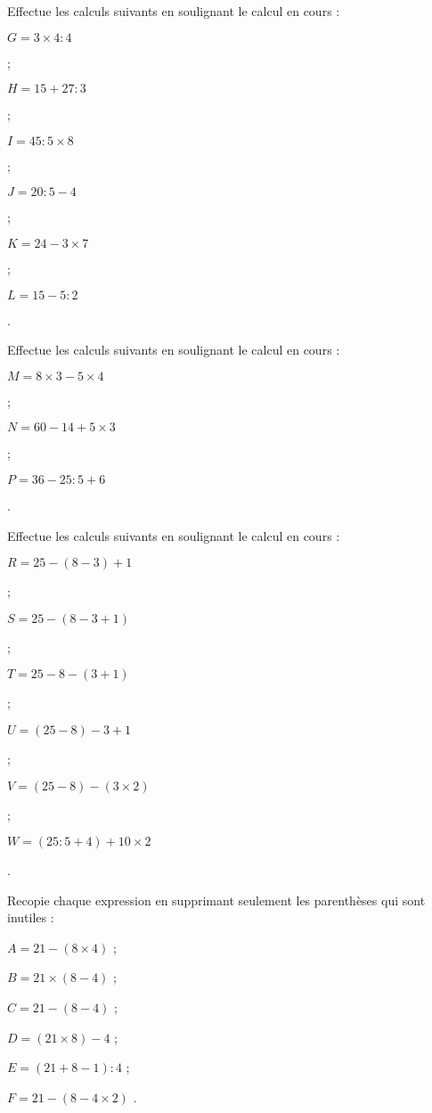 \begin{exercice}
Effectue les calculs suivants en soulignant le calcul en cours :

$G = 3 \times 4 : 4$ \dotfill

\dotfill ;

$H = 15 + 27 : 3$ \dotfill

\dotfill ;
	
$I = 45 : 5 \times 8$ \dotfill

\dotfill ;
	
$J = 20 : 5 - 4$ \dotfill	

\dotfill ;
	
$K = 24 - 3 \times 7$ \dotfill

\dotfill ;
	
$L = 15 - 5 : 2$ \dotfill

\dotfill.
\end{exercice}


\begin{exercice}
Effectue les calculs suivants en soulignant le calcul en cours :

$M = 8 \times 3 - 5 \times 4$ \dotfill

\dotfill ;

$N = 60 - 14 + 5 \times 3$ \dotfill

\dotfill ;

$P = 36 - 25 : 5 + 6$ \dotfill

\dotfill.
\end{exercice}


\begin{exercice}
Effectue les calculs suivants en soulignant le calcul en cours :

$R = 25 - ( 8 - 3 ) + 1$ \dotfill

\dotfill ;

$S = 25 - ( 8 - 3 + 1)$ \dotfill

\dotfill ;

$T = 25 - 8 - ( 3 + 1 )$ \dotfill

\dotfill ;

$U = ( 25 - 8 ) - 3 + 1$ \dotfill

\dotfill ;

$V = ( 25 - 8 ) - ( 3 \times 2 )$ \dotfill 

\dotfill ;

$W = ( 25 : 5 + 4 ) + 10 \times 2$ \dotfill

\dotfill.
\end{exercice}


\begin{exercice}
Recopie chaque expression en supprimant seulement les parenthèses qui sont inutiles :

$A = 21 - ( 8 \times 4 )$ \dotfill ;

$B = 21 \times ( 8 - 4 )$ \dotfill ;

$C = 21 - ( 8 - 4 )$ \dotfill ;

$D = ( 21 \times 8 ) - 4$ \dotfill ;

$E = ( 21 + 8 - 1 ) : 4$  \dotfill ;

$F = 21 - ( 8 - 4 \times 2 )$ \dotfill.
\end{exercice}


